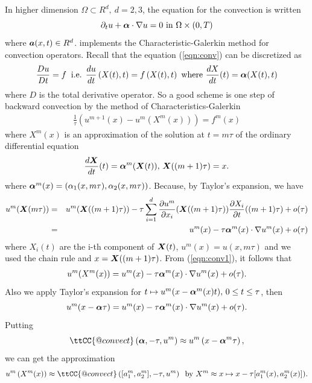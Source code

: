\documentclass[a4paper,twoside,12pt]{book}
\def\vec#1{\mbox{\boldmath $#1$}}
\def\p{\partial}
\begin{document}
In higher dimension $\Omega \subset R^{d},~d=2,3$, the equation for the
convection is written
\[
\p _{t}u+\vec{\alpha}\cdot \nabla u=0\hbox{ in }\Omega \times (0,T)
\]%
where  $\vec{a}(x,t)\in R^{d}$.
\freefempp implements the Characteristic-Galerkin method for convection operators. Recall that the equation (\ref{eqn:conv})
can be discretized as
\[
\frac{Du}{Dt} = f\;\;\textrm{i.e. }\frac{du}{dt}\left( {X(t),t} \right) = f\left(X( t ),t \right)\textrm{  where  }\frac{dX}{dt}( t ) = \vec \alpha( {X(t),t})
\]
where $D$  is  the total derivative operator.
So a good scheme is one step of backward
convection by the method of Characteristics-Galerkin
\begin{eqnarray}
\label{eqn:Charac}
\frac{1}{{\tau }}\left(u^{m + 1}(x) - u^m(X^m(x))\right) = f^m (x)
\end{eqnarray}
where $X^m (x)$ is an approximation of the solution at $t = m\tau $
of the ordinary differential equation
\[
\frac{d\vec{X}}{dt}(t) = \vec{\alpha}^m(\vec{X}(t)),\, \vec{X}((m + 1)\tau ) = x.
\]
where $\vec{\alpha}^m(x)=(\alpha_1(x,m\tau ),\alpha_2(x,m\tau ))$.
Because, by Taylor's expansion, we have
\begin{eqnarray}
\label{eqn:conv1}
u^m(\vec {X}(m\tau ))&=&
u^m(\vec{X}((m+1)\tau )) -
\tau \sum_{i=1}^d \frac{\p u^m}{\p x_i}(\vec{X}((m+1)\tau ))
\frac{\p X_i}{\p t}((m+1)\tau )
+o(\tau )\nonumber\\
&=&u^m(x)-\tau \vec{\alpha}^m(x)\cdot \nabla u^m(x)+o(\tau )
\end{eqnarray}
where $X_i(t)$ are the i-th component of $\vec{X}(t)$,
$u^m(x)=u(x,m\tau )$
and we used the chain rule and $x=\vec{X}((m+1)\tau )$.
From (\ref{eqn:conv1}), it follows that
\begin{eqnarray}
u^m(X^m(x))=u^m(x)-\tau \vec{\alpha}^m(x)\cdot \nabla u^m(x)+o(\tau ).
\end{eqnarray}
Also we apply Taylor's expansion for
$t\mapsto u^m(x-\vec{\alpha}^m(x)t),\, 0\le t\le \tau $, then
\[
u^m(x-\vec{\alpha}\tau )=u^m(x)-\tau \vec{\alpha}^m(x)\cdot \nabla u^m(x)+o(\tau ).
\]
Putting
\[
\ttCC{@convect}\left( {\vec{\alpha},-\tau ,u^m } \right)
\approx u^m \left(x - \vec{\alpha}^m\tau  \right),%
\]
we can get the approximation
\[
u^m \left( {X^m( x )} \right) \approx
{\ttCC{@convect}}\left( {[a_1^m ,a_2^m],-\tau ,u^m } \right)\;\;
\textrm{by }X^m \approx x \mapsto x- \tau [a_1^m(x) ,a_2^m(x)]  ).%
\]
\end{document}
